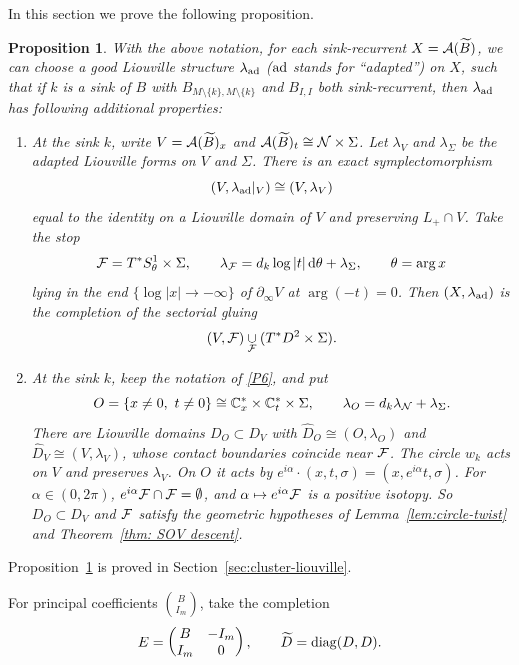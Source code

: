 \documentclass[12pt, letter]{amsart}
\newtheorem{proposition}[dummy]{Proposition}
\theoremstyle{definition}
\begin{document}
In this section we prove the following proposition. 


\begin{proposition}\label{prop:lambda_ad} 
With the above notation,  for each sink-recurrent $X=\mathcal{A}(\widetilde B)$, we can choose a good Liouville structure $\lambda_{\mathrm{ad}}$ (\( \rm{ad} \) stands for ``adapted'') on \(X\), such that 
if $k$ is a sink of $B$ with $B_{M\setminus\{k\},M\setminus\{k\}}$ and $B_{I,I}$ both sink-recurrent, then $\lambda_{\mathrm{ad}}$ has following additional properties:
\begin{enumerate}[resume*=P]
\item
\label{P6} 
At the sink $k$, write $V=\mathcal{A}(\widetilde B)_x$ and $\mathcal{A}(\widetilde B)_t\cong\mathcal{N}\times\Sigma$.
Let $\lambda_V$ and $\lambda_\Sigma$ be the adapted Liouville forms on $V$ and $\Sigma$.
There is an exact symplectomorphism
\[
 (V,\lambda_{\mathrm{ad}}|_V)\cong(V,\lambda_{V})
\]
equal to the identity on a Liouville domain of $V$ and preserving $L_+\cap V$.
Take the stop
\[
 \mathcal{F}=T^*S^1_\theta\times\Sigma,\qquad \lambda_{\mathcal{F}}=d_k\log|t|\,\mathrm{d}\theta+\lambda_\Sigma,
 \qquad \theta=\arg x
\]
lying in the end $\{\log|x|\to-\infty\}$ of $\partial_\infty V$ at $\arg(-t)=0$.
Then $(X,\lambda_{\mathrm{ad}})$ is the completion of the sectorial gluing
\[
 (V,\mathcal{F})\underset{\mathcal{F}}{\cup}(T^*D^2\times\Sigma).
\]

\item\label{P7}
At the sink $k$, keep the notation of \ref{P6}, and put
\[
 O=\{x\ne0,\ t\ne0\}\cong\bC^*_x\times\bC^*_t\times\Sigma,\qquad
 \lambda_O=d_k\lN+\lambda_\Sigma .
\]
There are Liouville domains $D_O\subset D_V$ with $\widehat D_O\cong(O,\lambda_O)$ and $\widehat D_V\cong(V,\lambda_V)$, whose contact boundaries coincide near $\mathcal{F}$.
The circle $w_k$ acts on $V$ and preserves $\lambda_V$.
On $O$ it acts by $e^{i\alpha}\cdot(x,t,\sigma)=(x,e^{i\alpha}t,\sigma)$.
For $\alpha\in(0,2\pi)$, $e^{i\alpha}\mathcal{F}\cap\mathcal{F}=\emptyset$, and $\alpha\mapsto e^{i\alpha}\mathcal{F}$ is a positive isotopy.
So $D_O\subset D_V$ and $\mathcal{F}$ satisfy the geometric hypotheses of Lemma~\ref{lem:circle-twist} and Theorem~\ref{thm: SOV descent}.
\end{enumerate}
\end{proposition}

Proposition~\ref{prop:lambda_ad} is proved in Section~\ref{sec:cluster-liouville}.

For principal coefficients \(\binom{B}{I_m}\), take the completion
\begin{equation}\label{eq:principal-completion}
 E=\begin{pmatrix}B&-I_m\\I_m&0\end{pmatrix},\qquad \widetilde D=\operatorname{diag}(D,D).
\end{equation}
\end{document}
